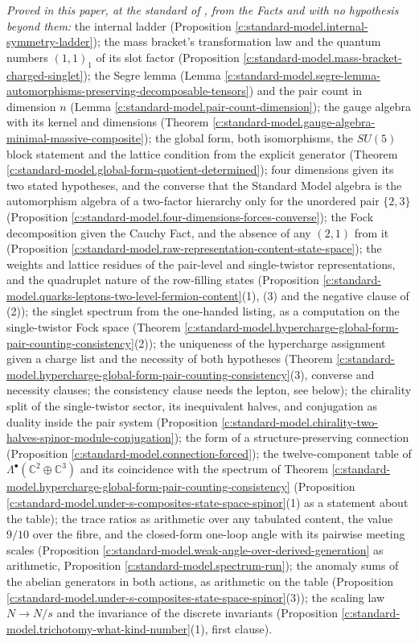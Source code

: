 \documentclass[11pt]{article}
\theoremstyle{definition}
\theoremstyle{plain}
\providecommand{\C}{}\renewcommand{\C}{\mathbb{C}}
\begin{document}
\label{c:note.standard-model.setting-levels-results-successor-problems}
\emph{Proved in this paper, at the standard of \cite{ButlerT1}, from the Facts and with no hypothesis beyond them:} the internal ladder (Proposition \ref{c:standard-model.internal-symmetry-ladder}); the mass bracket's transformation law and the quantum numbers $(1,1)_{1}$ of its slot factor (Proposition \ref{c:standard-model.mass-bracket-charged-singlet}); the Segre lemma (Lemma \ref{c:standard-model.segre-lemma-automorphisms-preserving-decomposable-tensors}) and the pair count in dimension $n$ (Lemma \ref{c:standard-model.pair-count-dimension}); the gauge algebra with its kernel and dimensions (Theorem \ref{c:standard-model.gauge-algebra-minimal-massive-composite}); the global form, both isomorphisms, the $SU(5)$ block statement and the lattice condition from the explicit generator (Theorem \ref{c:standard-model.global-form-quotient-determined}); four dimensions given its two stated hypotheses, and the converse that the Standard Model algebra is the automorphism algebra of a two-factor hierarchy only for the unordered pair $\{2, 3\}$ (Proposition \ref{c:standard-model.four-dimensions-forces-converse}); the Fock decomposition given the Cauchy Fact, and the absence of any $(2,1)$ from it (Proposition \ref{c:standard-model.raw-representation-content-state-space}); the weights and lattice residues of the pair-level and single-twistor representations, and the quadruplet nature of the row-filling states (Proposition \ref{c:standard-model.quarks-leptons-two-level-fermion-content}(1), (3) and the negative clause of (2)); the singlet spectrum from the one-handed listing, as a computation on the single-twistor Fock space (Theorem \ref{c:standard-model.hypercharge-global-form-pair-counting-consistency}(2)); the uniqueness of the hypercharge assignment given a charge list and the necessity of both hypotheses (Theorem \ref{c:standard-model.hypercharge-global-form-pair-counting-consistency}(3), converse and necessity clauses; the consistency clause needs the lepton, see below); the chirality split of the single-twistor sector, its inequivalent halves, and conjugation as duality inside the pair system (Proposition \ref{c:standard-model.chirality-two-halves-spinor-module-conjugation}); the form of a structure-preserving connection (Proposition \ref{c:standard-model.connection-forced}); the twelve-component table of $\Lambda^{\bullet}(\C^{2} \oplus \C^{3})$ and its coincidence with the spectrum of Theorem \ref{c:standard-model.hypercharge-global-form-pair-counting-consistency} (Proposition \ref{c:standard-model.under-s-composites-state-space-spinor}(1) as a statement about the table); the trace ratios as arithmetic over any tabulated content, the value $9/10$ over the fibre, and the closed-form one-loop angle with its pairwise meeting scales (Proposition \ref{c:standard-model.weak-angle-over-derived-generation} as arithmetic, Proposition \ref{c:standard-model.spectrum-run}); the anomaly sums of the abelian generators in both actions, as arithmetic on the table (Proposition \ref{c:standard-model.under-s-composites-state-space-spinor}(3)); the scaling law $N \to N/s$ and the invariance of the discrete invariants (Proposition \ref{c:standard-model.trichotomy-what-kind-number}(1), first clause).
\end{document}
